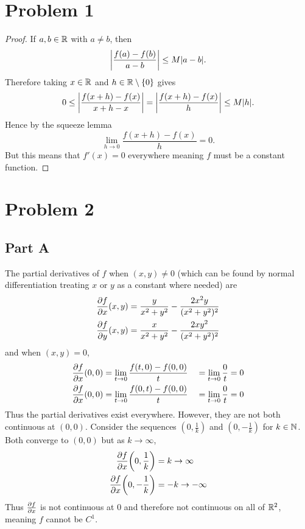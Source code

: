 \documentclass{eeleyes}
\begin{document}
\section*{Problem 1}
\begin{proof}
    If $a, b \in \mathbb{R}$ with $a \neq b$, then
    \[
        \qty|\frac{f(a) - f(b)}{a - b}| \leq M |a - b|
    .\]
    Therefore taking $x \in \mathbb{R}$ and $h \in \mathbb{R} \setminus \qty{0}$ gives
    \[
        0 \leq \qty|\frac{f(x + h) - f(x)}{x + h - x}| = \qty|\frac{f(x+h) - f(x)}{h}| \leq M |h|
    .\]
    Hence by the squeeze lemma
    \[
        \lim_{h \to 0} \frac{f(x+h) - f(x)}{h} = 0
    .\]
    But this means that $f'(x) = 0$ everywhere meaning $f$ must be a constant function.
\end{proof}

\section*{Problem 2}

\subsection*{Part A}
The partial derivatives of $f$ when $(x,y) \neq 0$ (which can be found by normal differentiation treating $x$ or $y$ as a constant where needed) are
\begin{align*}
    \pdv{f}{x} \relax(x,y) &= \frac{y}{x^2 + y^2} - \frac{2 x^2 y}{(x^2 + y^2)^2} \\
    \pdv{f}{y} \relax(x,y) &= \frac{x}{x^2 + y^2} - \frac{2 x y^2}{(x^2 + y^2)^2}
\end{align*}
and when $(x,y) = 0$,
\begin{alignat*}{3}
    \pdv{f}{x}\relax(0,0) &= \lim_{t \to 0} \frac{f(t,0) - f(0,0)}{t} &&= \lim_{t \to 0} \frac{0}{t} = 0 \\
    \pdv{f}{x}\relax(0,0) &= \lim_{t \to 0} \frac{f(0,t) - f(0,0)}{t} &&= \lim_{t \to 0} \frac{0}{t} = 0
\end{alignat*}
Thus the partial derivatives exist everywhere. However, they are not both continuous at $(0,0)$. Consider the sequences $(0, \frac{1}{k})$ and $(0, -\frac{1}{k})$ for $k \in \mathbb{N}$. Both converge to $(0,0)$ but as $k \to \infty$,
\begin{align*}
    \pdv{f}{x}\relax\qty(0, \frac{1}{k}) &= k \to \infty \\
    \pdv{f}{x}\relax\qty(0, -\frac{1}{k}) &= -k \to -\infty
\end{align*}
Thus $\pdv{f}{x}$ is not continuous at $0$ and therefore not continuous on all of $\mathbb{R}^2$, meaning $f$ cannot be $C^1$.
\end{document}

